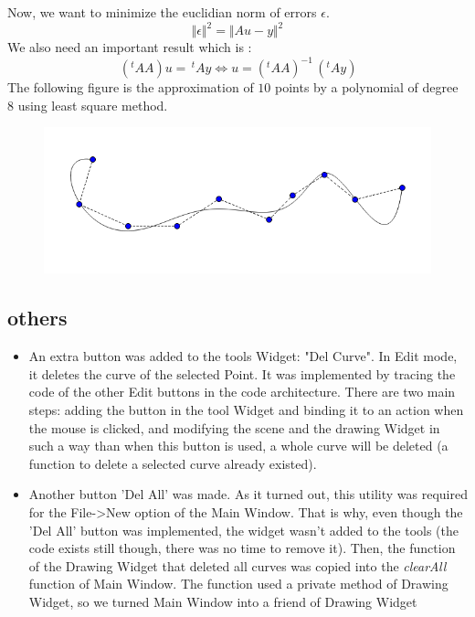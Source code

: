 \documentclass{article}
\begin{document}
 Now, we want to minimize the euclidian norm of errors $\epsilon$.
 \[  
 	\Vert \epsilon \Vert^2 = \Vert Au - y \Vert^2
 \]
 We also need an important result which is : 
 \[ \,(^tAA)u = \,^tAy \iff u =  (^tAA)^{-1}\,(^tAy)\] 
 The following figure is the approximation of $10$ points by a polynomial of degree $8$ using
 least square method.
 \begin{figure}[H]
	\center
   \includegraphics[scale = 0.4]{Pictures/sq1.png}
\end{figure}
 \subsection*{others}
 \begin{itemize}
 \item An extra button was added to the tools Widget: "Del Curve". In Edit mode, it deletes the curve of the selected Point. It was implemented by tracing the code of the other Edit buttons in the code architecture. There are two main steps: adding the button in the tool Widget and binding it to an action when the mouse is clicked, and modifying the scene and the drawing Widget in such a way than when this button is used, a whole curve will be deleted (a function to delete a selected curve already existed).
 \item Another button 'Del All' was made. As it turned out, this utility was required for the File->New option of the Main Window. That is why, even though the 'Del All' button was implemented, the widget wasn't added to the tools (the code exists still though, there was no time to remove it). Then, the function of the Drawing Widget that deleted all curves was copied into the \textit{clearAll} function of Main Window. The function used a private method of Drawing Widget, so we turned Main Window into a friend of Drawing Widget
   \end{itemize}
\end{document}
